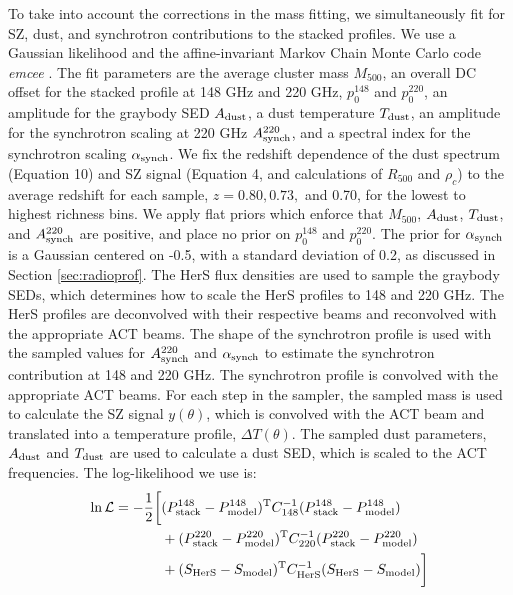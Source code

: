 \documentclass[a4paper,fleqn,usenatbib]{mnras}
\begin{document}
To take into account the corrections in the mass fitting, we simultaneously fit for SZ, dust, and synchrotron contributions to the stacked profiles. 
We use a Gaussian likelihood and the affine-invariant Markov Chain Monte Carlo code \textit{emcee} \citep{2013PASP..125..306F}. 
The fit parameters are the average cluster mass $M_{500}$, an overall DC offset for the stacked profile at 148 GHz and 220 GHz, $p_0^{148}$ and $p_0^{220}$, an amplitude for the graybody SED $A_{\rm dust}$, a dust temperature $T_{\rm dust}$, an amplitude for the synchrotron scaling at 220 GHz $A_{\rm synch}^{220}$, and a spectral index for the synchrotron scaling $\alpha_{\rm synch}$. 
We fix the redshift dependence of the dust spectrum (Equation 10) and SZ signal (Equation 4, and calculations of $R_{500}$ and $\rho_c$) to the average redshift for each sample, $z = 0.80, 0.73,$ and 0.70, for the lowest to highest richness bins. 
We apply flat priors which enforce that $M_{500}$, $A_{\rm dust}$, $T_{\rm dust}$, and $A_{\rm synch}^{220}$ are positive, and place no prior on $p_0^{148}$ and $p_0^{220}$.
The prior for $\alpha_{\rm synch}$ is a Gaussian centered on -0.5, with a standard deviation of 0.2, as discussed in Section \ref{sec:radioprof}. 
The HerS flux densities are used to sample the graybody SEDs, which determines how to scale the HerS profiles to 148 and 220 GHz. 
The HerS profiles are deconvolved with their respective beams and reconvolved with the appropriate ACT beams.
The shape of the synchrotron profile is used with the sampled values for $A_{\rm synch}^{220}$ and $\alpha_{\rm synch}$ to estimate the synchrotron contribution at 148 and 220 GHz.
The synchrotron profile is convolved with the appropriate ACT beams.
For each step in the sampler, the sampled mass is used to calculate the SZ signal $y(\theta)$, which is convolved with the ACT beam and translated into a temperature profile, $\Delta T(\theta)$.
The sampled dust parameters, $A_{\rm dust}$ and $T_{\rm dust}$ are used to calculate a dust SED, which is scaled to the ACT frequencies.
The  log-likelihood we use is:
\begin{equation}
\begin{split}
    \ln \mathcal{L} = -\frac{1}{2} \bigg[ & (P^{148}_{\rm stack} - P^{148}_{\rm model})^{\rm T} C_{148}^{-1} (P^{148}_{\rm stack} - P^{148}_{\rm model}) \\
    & + (P^{220}_{\rm stack} - P^{220}_{\rm model})^{\rm T} C_{220}^{-1} (P^{220}_{\rm stack} - P^{220}_{\rm model}) \\
    & + (S_{\rm HerS} - S_{\rm model})^{\rm T} C_{\rm HerS}^{-1} (S_{\rm HerS} - S_{\rm model}) \bigg]
\end{split}
\end{equation}
\end{document}
